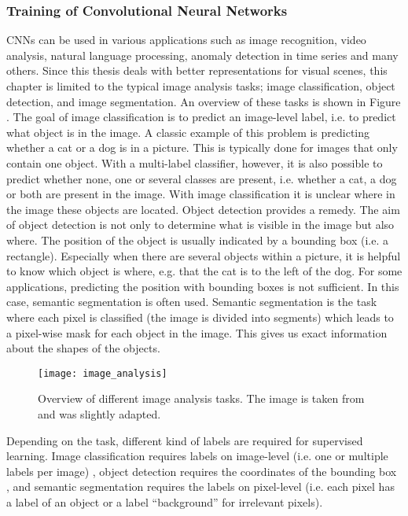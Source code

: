 \subsubsection{Training of Convolutional Neural Networks}
CNNs can be used in various applications such as image recognition, video analysis, natural language processing, anomaly detection in time series and many others.
Since this thesis deals with better representations for visual scenes, this chapter is limited to the typical image analysis tasks; image classification, object detection, and image segmentation.
An overview of these tasks is shown in Figure .
The goal of image classification is to predict an image-level label, i.e. to predict what object is in the image.
A classic example of this problem is predicting whether a cat or a dog is in a picture.
This is typically done for images that only contain one object.
With a multi-label classifier, however, it is also possible to predict whether none, one or several classes are present, i.e. whether a cat, a dog or both are present in the image.
With image classification it is unclear where in the image these objects are located.
Object detection provides a remedy.
The aim of object detection is not only to determine what is visible in the image but also where.
The position of the object is usually indicated by a bounding box (i.e. a rectangle).
Especially when there are several objects within a picture, it is helpful to know which object is where, e.g. that the cat is to the left of the dog.
For some applications, predicting the position with bounding boxes is not sufficient.
In this case, semantic segmentation is often used.
Semantic segmentation is the task where each pixel is classified (the image is divided into segments) which leads to a pixel-wise mask for each object in the image.
This gives us exact information about the shapes of the objects.

\begin{figure}[h]
    \centering
    \texttt{[image: image\_analysis]}
    \caption[Overview of different image analysis tasks]{Overview of different image analysis tasks. The image is taken from  and was slightly adapted.}
\end{figure}


Depending on the task, different kind of labels are required for supervised learning.
Image classification requires labels on image-level (i.e. one or multiple labels per image) \cite{Lecun_Bottou_Bengio_Haffner_1998, NIPS2012_c399862d, Simonyan_Zisserman_2015, Szegedy_Liu_Jia_Sermanet_Reed_Anguelov_Erhan_Vanhoucke_Rabinovich_2014, He_Zhang_Ren_Sun_2016}, object detection requires the coordinates of the bounding box \cite{Redmon_Divvala_Girshick_Farhadi_2016, Liu_Anguelov_Erhan_Szegedy_Reed_Fu_Berg_2016, He_Gkioxari_Dollar_Girshick_2017}, and semantic segmentation requires the labels on pixel-level \cite{Ronneberger_Fischer_Brox_2015, Wu_Zhang_Huang_Liang_Yu_2019} (i.e. each pixel has a label of an object or a label ``background'' for irrelevant pixels).

